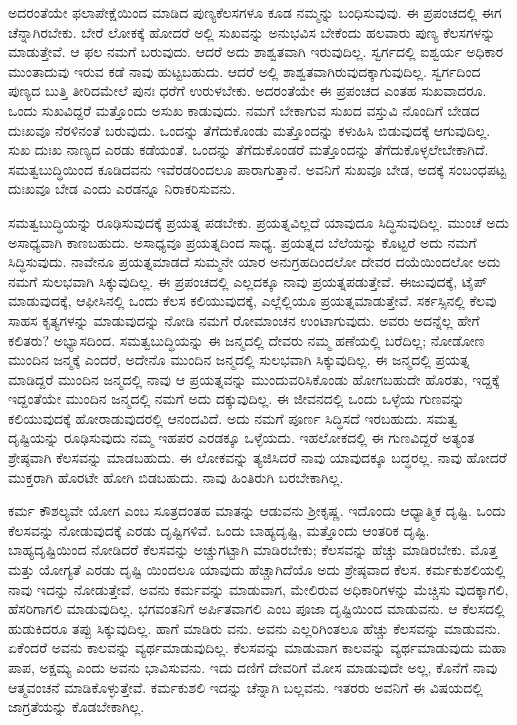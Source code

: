 ಅದರಂತೆಯೇ ಫಲಾಪೇಕ್ಷೆಯಿಂದ ಮಾಡಿದ ಪುಣ್ಯಕೆಲಸಗಳೂ ಕೂಡ ನಮ್ಮನ್ನು ಬಂಧಿಸುವುವು. ಈ ಪ್ರಪಂಚದಲ್ಲಿ ಈಗ ಚೆನ್ನಾಗಿರಬೇಕು. ಬೇರೆ ಲೋಕಕ್ಕೆ ಹೋದರೆ ಅಲ್ಲಿ ಸುಖವನ್ನು ಅನುಭವಿಸ ಬೇಕೆಂದು ಹಲವಾರು ಪುಣ್ಯ ಕೆಲಸಗಳನ್ನು ಮಾಡುತ್ತೇವೆ. ಆ ಫಲ ನಮಗೆ ಬರುವುದು. ಆದರೆ ಅದು ಶಾಶ್ವತವಾಗಿ ಇರುವುದಿಲ್ಲ. ಸ್ವರ್ಗದಲ್ಲಿ ಐಶ್ವರ್ಯ ಅಧಿಕಾರ ಮುಂತಾದುವು ಇರುವ ಕಡೆ ನಾವು ಹುಟ್ಟಬಹುದು. ಆದರೆ ಅಲ್ಲಿ ಶಾಶ್ವತವಾಗಿರುವುದಕ್ಕಾಗುವುದಿಲ್ಲ. ಸ್ವರ್ಗದಿಂದ ಪುಣ್ಯದ ಬುತ್ತಿ ತೀರಿದಮೇಲೆ ಪುನಃ ಧರೆಗೆ ಉರುಳಬೇಕು. ಅದರಂತೆಯೇ ಈ ಪ್ರಪಂಚದ ಎಂತಹ ಸುಖವಾದರೂ. ಒಂದು ಸುಖವಿದ್ದರೆ ಮತ್ತೊಂದು ಅಸುಖ ಕಾಡುವುದು. ನಮಗೆ ಬೇಕಾಗುವ ಸುಖದ ವಸ್ತುವಿ ನೊಂದಿಗೆ ಬೇಡದ ದುಃಖವೂ ನೆರಳಿನಂತೆ ಬರುವುದು. ಒಂದನ್ನು ತೆಗೆದುಕೊಂಡು ಮತ್ತೊಂದನ್ನು ಕಳುಹಿಸಿ ಬಿಡುವುದಕ್ಕೆ ಆಗುವುದಿಲ್ಲ. ಸುಖ ದುಃಖ ನಾಣ್ಯದ ಎರಡು ಕಡೆಯಂತೆ. ಒಂದನ್ನು ತೆಗೆದುಕೊಂಡರೆ ಮತ್ತೊಂದನ್ನು ತೆಗೆದುಕೊಳ್ಳಲೇಬೇಕಾಗಿದೆ. ಸಮತ್ವಬುದ್ಧಿಯಿಂದ ಕೂಡಿದವನು ಇವೆರಡರಿಂದಲೂ ಪಾರಾಗುತ್ತಾನೆ. ಅವನಿಗೆ ಸುಖವೂ ಬೇಡ, ಅದಕ್ಕೆ ಸಂಬಂಧಪಟ್ಟ ದುಃಖವೂ ಬೇಡ ಎಂದು ಎರಡನ್ನೂ ನಿರಾಕರಿಸುವನು.

ಸಮತ್ವಬುದ್ಧಿಯನ್ನು ರೂಢಿಸುವುದಕ್ಕೆ ಪ್ರಯತ್ನ ಪಡಬೇಕು. ಪ್ರಯತ್ನವಿಲ್ಲದೆ ಯಾವುದೂ ಸಿದ್ಧಿಸುವುದಿಲ್ಲ. ಮುಂಚೆ ಅದು ಅಸಾಧ್ಯವಾಗಿ ಕಾಣಬಹುದು. ಅಸಾಧ್ಯವೂ ಪ್ರಯತ್ನದಿಂದ ಸಾಧ್ಯ. ಪ್ರಯತ್ನದ ಬೆಲೆಯನ್ನು ಕೊಟ್ಟರೆ ಅದು ನಮಗೆ ಸಿದ್ಧಿಸುವುದು. ನಾವೇನೂ ಪ್ರಯತ್ನಮಾಡದೆ ಸುಮ್ಮನೇ ಯಾರ ಅನುಗ್ರಹದಿಂದಲೋ ದೇವರ ದಯೆಯಿಂದಲೋ ಅದು ನಮಗೆ ಸುಲಭವಾಗಿ ಸಿಕ್ಕುವುದಿಲ್ಲ. ಈ ಪ್ರಪಂಚದಲ್ಲಿ ಎಲ್ಲದಕ್ಕೂ ನಾವು ಪ್ರಯತ್ನಪಡುತ್ತೇವೆ. ಈಜುವುದಕ್ಕೆ, ಟೈಪ್ ಮಾಡುವುದಕ್ಕೆ, ಆಫೀಸಿನಲ್ಲಿ ಒಂದು ಕೆಲಸ ಕಲಿಯುವುದಕ್ಕೆ, ಎಲ್ಲೆಲ್ಲಿಯೂ ಪ್ರಯತ್ನಮಾಡುತ್ತೇವೆ. ಸರ್ಕಸ್ಸಿನಲ್ಲಿ ಕೆಲವು ಸಾಹಸ ಕೃತ್ಯಗಳನ್ನು ಮಾಡುವುದನ್ನು ನೋಡಿ ನಮಗೆ ರೋಮಾಂಚನ ಉಂಟಾಗುವುದು. ಅವರು ಅದನ್ನೆಲ್ಲ ಹೇಗೆ ಕಲಿತರು? ಅಭ್ಯಾಸದಿಂದ. ಸಮತ್ವಬುದ್ಧಿಯನ್ನು ಈ ಜನ್ಮದಲ್ಲಿ ದೇವರು ನಮ್ಮ ಹಣೆಯಲ್ಲಿ ಬರೆದಿಲ್ಲ; ನೋಡೋಣ ಮುಂದಿನ ಜನ್ಮಕ್ಕೆ ಎಂದರೆ, ಅದೇನೊ ಮುಂದಿನ ಜನ್ಮದಲ್ಲಿ ಸುಲಭವಾಗಿ ಸಿಕ್ಕುವುದಿಲ್ಲ. ಈ ಜನ್ಮದಲ್ಲಿ ಪ್ರಯತ್ನ ಮಾಡಿದ್ದರೆ ಮುಂದಿನ ಜನ್ಮದಲ್ಲಿ ನಾವು ಆ ಪ್ರಯತ್ನವನ್ನು ಮುಂದುವರಿಸಿಕೊಂಡು ಹೋಗಬಹುದೇ ಹೊರತು, ಇದ್ದಕ್ಕೆ ಇದ್ದಂತೆಯೇ ಮುಂದಿನ ಜನ್ಮದಲ್ಲಿ ನಮಗೆ ಅದು ದಕ್ಕುವುದಿಲ್ಲ. ಈ ಜೀವನದಲ್ಲಿ ಒಂದು ಒಳ್ಳೆಯ ಗುಣವನ್ನು ಕಲಿಯುವುದಕ್ಕೆ ಹೋರಾಡುವುದರಲ್ಲಿ ಆನಂದವಿದೆ. ಅದು ನಮಗೆ ಪೂರ್ಣ ಸಿದ್ಧಿಸದೆ ಇರಬಹುದು. ಸಮತ್ವ ದೃಷ್ಟಿಯನ್ನು ರೂಢಿಸುವುದು ನಮ್ಮ ಇಹಪರ ಎರಡಕ್ಕೂ ಒಳ್ಳೆಯದು. ಇಹಲೋಕದಲ್ಲಿ ಈ ಗುಣವಿದ್ದರೆ ಅತ್ಯಂತ ಶ್ರೇಷ್ಠವಾಗಿ ಕೆಲಸವನ್ನು ಮಾಡಬಹುದು. ಈ ಲೋಕವನ್ನು ತ್ಯಜಿಸಿದರೆ ನಾವು ಯಾವುದಕ್ಕೂ ಬದ್ಧರಲ್ಲ. ನಾವು ಹೋದರೆ ಮುಕ್ತರಾಗಿ ಹೊರಟೇ ಹೋಗಿ ಬಿಡಬಹುದು. ನಾವು ಹಿಂತಿರುಗಿ ಬರಬೇಕಾಗಿಲ್ಲ.

ಕರ್ಮ ಕೌಶಲ್ಯವೇ ಯೋಗ ಎಂಬ ಸೂತ್ರದಂತಹ ಮಾತನ್ನು ಆಡುವನು ಶ್ರೀಕೃಷ್ಣ. ಇದೊಂದು ಆಧ್ಯಾತ್ಮಿಕ ದೃಷ್ಟಿ. ಒಂದು ಕೆಲಸವನ್ನು ನೋಡುವುದಕ್ಕೆ ಎರಡು ದೃಷ್ಟಿಗಳಿವೆ. ಒಂದು ಬಾಹ್ಯದೃಷ್ಟಿ, ಮತ್ತೊಂದು ಆಂತರಿಕ ದೃಷ್ಟಿ. ಬಾಹ್ಯದೃಷ್ಟಿಯಿಂದ ನೋಡಿದರೆ ಕೆಲಸವನ್ನು ಅಚ್ಚುಗಟ್ಟಾಗಿ ಮಾಡಿರಬೇಕು; ಕೆಲಸವನ್ನು ಹೆಚ್ಚು ಮಾಡಿರಬೇಕು. ಮೊತ್ತ ಮತ್ತು ಯೋಗ್ಯತೆ ಎರಡು ದೃಷ್ಟಿ ಯಿಂದಲೂ ಯಾವುದು ಹೆಚ್ಚಾಗಿದೆಯೊ ಅದು ಶ್ರೇಷ್ಠವಾದ ಕೆಲಸ. ಕರ್ಮಕುಶಲಿಯಲ್ಲಿ ನಾವು ಇದನ್ನು ನೋಡುತ್ತೇವೆ. ಅವನು ಕರ್ಮವನ್ನು ಮಾಡುವಾಗ, ಮೇಲಿರುವ ಅಧಿಕಾರಿಗಳನ್ನು ಮೆಚ್ಚಿಸು ವುದಕ್ಕಾಗಲಿ, ಹೆಸರಿಗಾಗಲಿ ಮಾಡುವುದಿಲ್ಲ. ಭಗವಂತನಿಗೆ ಅರ್ಪಿತವಾಗಲಿ ಎಂಬ ಪೂಜಾ ದೃಷ್ಟಿಯಿಂದ ಮಾಡುವನು. ಆ ಕೆಲಸದಲ್ಲಿ ಹುಡುಕಿದರೂ ತಪ್ಪು ಸಿಕ್ಕುವುದಿಲ್ಲ. ಹಾಗೆ ಮಾಡಿರು ವನು. ಅವನು ಎಲ್ಲರಿಗಿಂತಲೂ ಹೆಚ್ಚು ಕೆಲಸವನ್ನು ಮಾಡುವನು. ಏಕೆಂದರೆ ಅವನು ಕಾಲವನ್ನು ವ್ಯರ್ಥಮಾಡುವುದಿಲ್ಲ. ಕೆಲಸವನ್ನು ಮಾಡುವಾಗ ಕಾಲವನ್ನು ವ್ಯರ್ಥಮಾಡುವುದು ಮಹಾ ಪಾಪ, ಅಕ್ಷಮ್ಯ ಎಂದು ಅವನು ಭಾವಿಸುವನು. ಇದು ದಣಿಗೆ ದೇವರಿಗೆ ಮೋಸ ಮಾಡುವುದೇ ಅಲ್ಲ, ಕೊನೆಗೆ ನಾವು ಆತ್ಮವಂಚನೆ ಮಾಡಿಕೊಳ್ಳುತ್ತೇವೆ. ಕರ್ಮಕುಶಲಿ ಇದನ್ನು ಚೆನ್ನಾಗಿ ಬಲ್ಲವನು. ಇತರರು ಅವನಿಗೆ ಈ ವಿಷಯದಲ್ಲಿ ಜಾಗ್ರತೆಯನ್ನು ಕೊಡಬೇಕಾಗಿಲ್ಲ.

